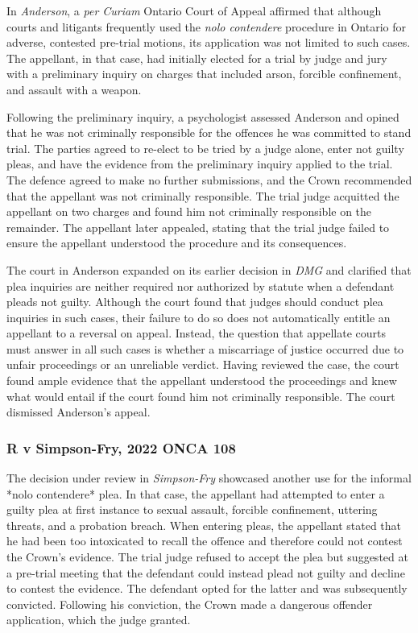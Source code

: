 In \textit{Anderson}, a \textit{per Curiam} Ontario Court of Appeal affirmed that although courts and litigants frequently used the \textit{nolo contendere}  procedure in Ontario for adverse, contested pre-trial motions, its application was not limited to such cases. The appellant, in that case, had initially elected for a trial by judge and jury with a preliminary inquiry on charges that included arson, forcible confinement, and assault with a weapon.

Following the preliminary inquiry, a psychologist assessed Anderson and opined that he was not criminally responsible for the offences he was committed to stand trial. The parties agreed to re-elect to be tried by a judge alone, enter not guilty pleas, and have the evidence from the preliminary inquiry applied to the trial. The defence agreed to make no further submissions, and the Crown recommended that the appellant was not criminally responsible. The trial judge acquitted the appellant on two charges and found him not criminally responsible on the remainder. The appellant later appealed, stating that the trial judge failed to ensure the appellant understood the procedure and its consequences.

The court in Anderson expanded on its earlier decision in \textit{DMG} and clarified that plea inquiries are neither required nor authorized by statute when a defendant pleads not guilty. Although the court found that judges should conduct plea inquiries in such cases, their failure to do so does not automatically entitle an appellant to a reversal on appeal. Instead, the question that appellate courts must answer in all such cases is whether a miscarriage of justice occurred due to unfair proceedings or an unreliable verdict. Having reviewed the case, the court found ample evidence that the appellant understood the proceedings and knew what would entail if the court found him not criminally responsible. The court dismissed Anderson's appeal.

\subsubsection{R v Simpson-Fry, 2022 ONCA 108}

The decision under review in \textit{Simpson-Fry} showcased another use for the informal *nolo contendere* plea. In that case, the appellant had attempted to enter a guilty plea at first instance to sexual assault, forcible confinement, uttering threats, and a probation breach. When entering pleas, the appellant stated that he had been too intoxicated to recall the offence and therefore could not contest the Crown's evidence. The trial judge refused to accept the plea but suggested at a pre-trial meeting that the defendant could instead plead not guilty and decline to contest the evidence. The defendant opted for the latter and was subsequently convicted. Following his conviction, the Crown made a dangerous offender application, which the judge granted.

